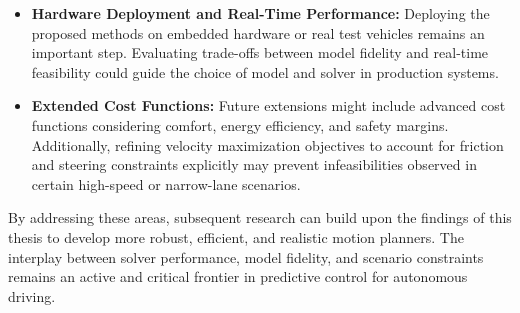 \begin{itemize}
	\item \textbf{Hardware Deployment and Real-Time Performance:}
	      Deploying the proposed methods on embedded hardware or real test vehicles remains an important step.
	      Evaluating trade-offs between model fidelity and real-time feasibility could guide the choice of model and solver in production systems.

	\item \textbf{Extended Cost Functions:}
	      Future extensions might include advanced cost functions considering comfort, energy efficiency, and safety margins.
	      Additionally, refining velocity maximization objectives to account for friction and steering constraints explicitly may prevent infeasibilities
	      observed in certain high-speed or narrow-lane scenarios.
\end{itemize}

By addressing these areas, subsequent research can build upon the findings of this thesis to develop more robust, efficient, and realistic motion
planners.
The interplay between solver performance, model fidelity, and scenario constraints remains an active and critical frontier in predictive control for
autonomous driving.
